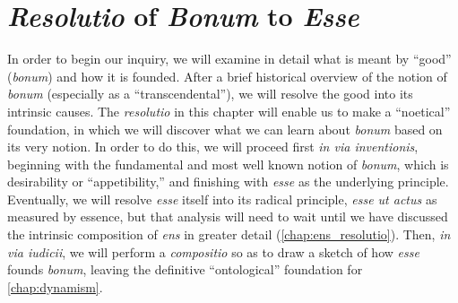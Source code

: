 
\chapter{\emph{Resolutio} of \emph{Bonum} to \emph{Esse}}
\label{chap:bonum}

In order to begin our inquiry, we will examine in detail what is meant by “good” (\emph{bonum}) and how it is founded. After a brief historical overview of the notion of \emph{bonum} (especially as a “transcendental”), we will resolve the good into its intrinsic causes. The \emph{resolutio} in this chapter will enable us to make a “noetical” foundation, in which we will discover what we can learn about \emph{bonum} based on its very notion. In order to do this, we will proceed first \emph{in via inventionis}, beginning with the fundamental and most well known notion of \emph{bonum}, which is desirability or “appetibility,” and finishing with \emph{esse} as the underlying principle. Eventually, we will resolve \emph{esse} itself into its radical principle, \emph{esse ut actus} as measured by essence, but that analysis will need to wait until we have discussed the intrinsic composition of \emph{ens} in greater detail (\autoref{chap:ens_resolutio}). Then, \emph{in via iudicii}, we will perform a \emph{compositio} so as to draw a sketch of how \emph{esse} founds \emph{bonum}, leaving the definitive “ontological” foundation for \autoref{chap:dynamism}.%
%

